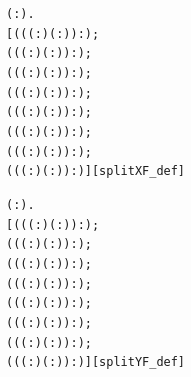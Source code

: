 \documentclass{article}
\begin{document}
\begin{alltt}
\HOLTokenTurnstile{} \HOLSymConst{\HOLTokenForall{}}( :).
       \HOLSymConst{=}
     [((( :) \HOLSymConst{\HOLTokenExtract{}} ( :))  :);
      ((( :) \HOLSymConst{\HOLTokenExtract{}} ( :))  :);
      ((( :) \HOLSymConst{\HOLTokenExtract{}} ( :))  :);
      ((( :) \HOLSymConst{\HOLTokenExtract{}} ( :))  :);
      ((( :) \HOLSymConst{\HOLTokenExtract{}} ( :))  :);
      ((( :) \HOLSymConst{\HOLTokenExtract{}} ( :))  :);
      ((( :) \HOLSymConst{\HOLTokenExtract{}} ( :))  :);
      ((( :) \HOLSymConst{\HOLTokenExtract{}} ( :))  :)]\hfill{[splitXF_def]}
\end{alltt}

\begin{alltt}
\HOLTokenTurnstile{} \HOLSymConst{\HOLTokenForall{}}( :).
       \HOLSymConst{=}
     [((( :) \HOLSymConst{\HOLTokenExtract{}} ( :))  :);
      ((( :) \HOLSymConst{\HOLTokenExtract{}} ( :))  :);
      ((( :) \HOLSymConst{\HOLTokenExtract{}} ( :))  :);
      ((( :) \HOLSymConst{\HOLTokenExtract{}} ( :))  :);
      ((( :) \HOLSymConst{\HOLTokenExtract{}} ( :))  :);
      ((( :) \HOLSymConst{\HOLTokenExtract{}} ( :))  :);
      ((( :) \HOLSymConst{\HOLTokenExtract{}} ( :))  :);
      ((( :) \HOLSymConst{\HOLTokenExtract{}} ( :))  :)]\hfill{[splitYF_def]}
\end{alltt}
\end{document}

